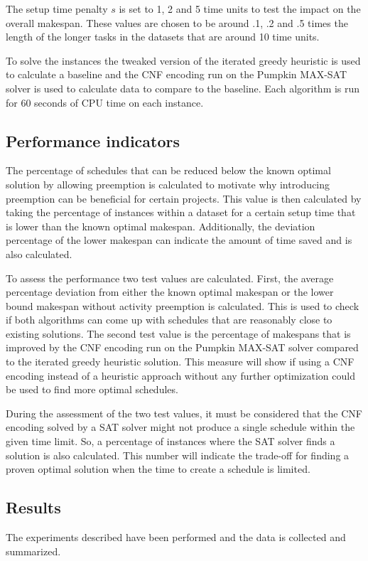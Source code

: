 The setup time penalty \(s\) is set to 1, 2 and 5 time units to test the impact on the overall makespan. These values are chosen to be around .1, .2 and .5 times the length of the longer tasks in the datasets that are around 10 time units.

To solve the instances the tweaked version of the iterated greedy heuristic is used to calculate a baseline and the CNF encoding run on the Pumpkin MAX-SAT solver is used to calculate data to compare to the baseline. Each algorithm is run for 60 seconds of CPU time on each instance.

\subsection{Performance indicators}
The percentage of schedules that can be reduced below the known optimal solution by allowing preemption is calculated to motivate why introducing preemption can be beneficial for certain projects. This value is then calculated by taking the percentage of instances within a dataset for a certain setup time that is lower than the known optimal makespan. Additionally, the deviation percentage of the lower makespan can indicate the amount of time saved and is also calculated.

To assess the performance two test values are calculated. First, the average percentage deviation from either the known optimal makespan or the lower bound makespan without activity preemption is calculated. This is used to check if both algorithms can come up with schedules that are reasonably close to existing solutions. The second test value is the percentage of makespans that is improved by the CNF encoding run on the Pumpkin MAX-SAT solver compared to the iterated greedy heuristic solution. This measure will show if using a CNF encoding instead of a heuristic approach without any further optimization could be used to find more optimal schedules.

During the assessment of the two test values, it must be considered that the CNF encoding solved by a SAT solver might not produce a single schedule within the given time limit. So, a percentage of instances where the SAT solver finds a solution is also calculated. This number will indicate the trade-off for finding a proven optimal solution when the time to create a schedule is limited.

\subsection{Results}
The experiments described have been performed and the data is collected and summarized.

